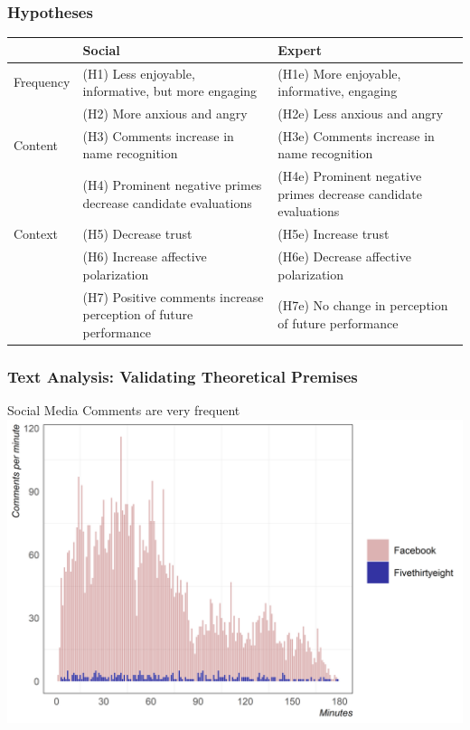 \documentclass{beamer}
\begin{document}
\begin{frame}
\frametitle{Hypotheses}

\scriptsize
\begin{table}
\begin{center}
\begin{tabular}{l p{35mm} p{38mm}  }
\hline


 & Social & Expert  \\
\hline
Frequency & (H1) Less enjoyable, informative, but more engaging & (H1e) More enjoyable, informative, engaging  \\ 

& (H2) More anxious and angry & (H2e) Less anxious and angry \\ \hline

Content & (H3) Comments increase in name recognition & (H3e) Comments increase in name recognition \\

& (H4) Prominent negative primes decrease candidate evaluations & 
(H4e) Prominent negative primes decrease candidate evaluations \\ \hline

Context & (H5) Decrease trust & (H5e) Increase trust \\ 
& (H6) Increase affective polarization & (H6e) Decrease affective polarization \\
& (H7) Positive comments increase perception of future performance  & (H7e) No change in perception of future performance \\ \hline


\end{tabular}
\end{center}
\end{table}


\end{frame}



\begin{frame}
\frametitle{Text Analysis: Validating Theoretical Premises}
\centering

Social Media Comments are very frequent
\includegraphics[width=1\linewidth]{freq-bind.png}

\end{frame}
\end{document}
